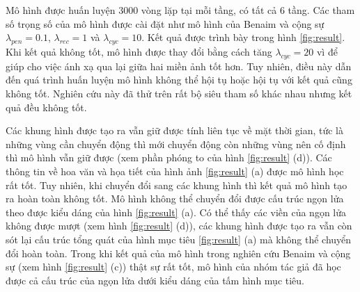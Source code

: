 \documentclass[12pt]{report}%
\begin{document}
Mô hình được huấn luyện 3000 vòng lặp tại mỗi tầng, có tất cả 6 tầng. Các tham số trọng số của mô hình được cài đặt như mô hình của Benaim và cộng sự \cite{benaim2020structuralanalogy} $\lambda_{pen} = 0.1 $, $\lambda_{rec} = 1$ và $\lambda_{cyc} = 10$. Kết quả được trình bày trong hình \ref{fig:result}. Khi kết quả không tốt, mô hình được thay đổi bằng cách tăng $\lambda_{cyc} = 20$ vì để giúp cho việc ánh xạ qua lại giữa hai miền ảnh tốt hơn. Tuy nhiên, điều này dẫn đến quá trình huấn luyện mô hình không thể hội tụ hoặc hội tụ với kết quả cũng không tốt. Nghiên cứu này đã thử trên rất bộ siêu tham số khác nhau nhưng kết quả đều không tốt.



Các khung hình được tạo ra vẫn giữ được tính liên tục về mặt thời gian, tức là những vùng cần chuyển động thì mới chuyển động còn những vùng nên cố định thì mô hình vẫn giữ được (xem phần phóng to của hình \ref{fig:result} (d)). Các thông tin về hoa văn và họa tiết của hình ảnh \ref{fig:result} (a) được mô hình học rất tốt. Tuy nhiên, khi chuyển đổi sang các khung hình thì kết quả mô hình tạo ra hoàn toàn không tốt. Mô hình không thể chuyển đổi được cấu trúc ngọn lửa theo được kiểu dáng của hình \ref{fig:result} (a). Có thể thấy các viền của ngọn lửa không được mượt (xem  hình \ref{fig:result} (d)), các khung hình được tạo ra vẫn còn sót lại cấu trúc tổng quát của hình mục tiêu \ref{fig:result} (a) mà không thể chuyển đổi hoàn toàn. Trong khi kết quả của mô hình trong nghiên cứu Benaim và cộng sự  (xem  hình \ref{fig:result} (c)) thật sự rất tốt, mô hình của nhóm tác giả đã học được cả cấu trúc của ngọn lửa dưới kiểu dáng của tấm hình mục tiêu. 


\clearpage
\end{document}
